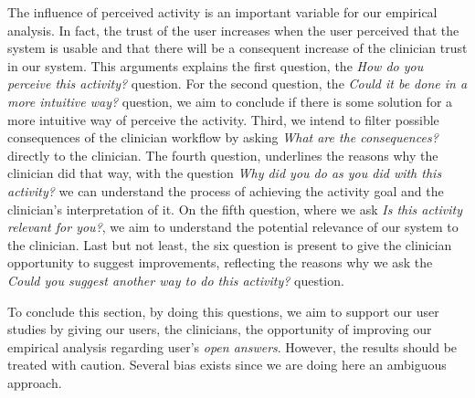 The influence of perceived activity \cite{flavian2006role} is an important variable for our empirical analysis. In fact, the trust of the user increases when the user perceived that the system is usable and that there will be a consequent increase of the clinician trust in our system. This arguments explains the first question, the \textit{How do you perceive this activity?} question. For the second question, the \textit{Could it be done in a more intuitive way?} question, we aim to conclude if there is some solution for a more intuitive way of perceive the activity. Third, we intend to filter possible consequences of the clinician workflow by asking \textit{What are the consequences?} directly to the clinician. The fourth question, underlines the reasons why the clinician did that way, with the question \textit{Why did you do as you did with this activity?} we can understand the process of achieving the activity goal and the clinician's interpretation of it. On the fifth question, where we ask \textit{Is this activity relevant for you?}, we aim to understand the potential relevance of our system to the clinician. Last but not least, the six question is present to give the clinician opportunity to suggest improvements, reflecting the reasons why we ask the \textit{Could you suggest another way to do this activity?} question.

To conclude this section, by doing this questions, we aim to support our user studies by giving our users, the clinicians, the opportunity of improving our empirical analysis regarding user's \textit{open answers}. However, the results should be treated with caution. Several bias exists since we are doing here an ambiguous approach.

\clearpage